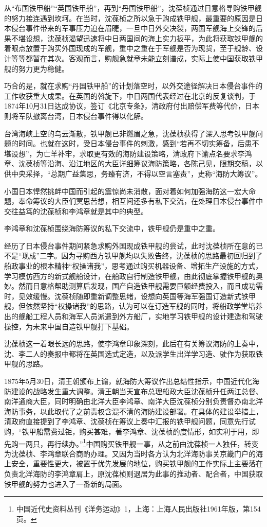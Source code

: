 \documentclass[12pt,UTF8]{ctexbook}
\begin{document}
从“布国铁甲船”“英国铁甲船”，再到“丹国铁甲船”，沈葆桢通过日意格寻购铁甲舰的努力接连遇到坎坷。在当时，沈葆桢之所以急于购成铁甲舰，最重要的原因是日本侵台事件带来的军事压力迫在眉睫，一旦中日外交决裂，两国军舰海上交锋的后果不堪设想，沈葆桢渴望迅速将中日两国间的海上实力扳平，为此将获取铁甲舰的着眼点放置于购买外国现成的军舰，重中之重在于军舰是否为现货，至于舰龄、设计等等都暂在其次。客观而言，购舰急就章未能立刻谱成，实际上使中国获取铁甲舰的努力更为稳健。

巧合的是，就在求购“丹国铁甲船”的计划落空时，以外交途径解决日本侵台事件的工作收获重大成果。在英国的斡旋下，中日两国代表经过在北京的反复谈判，于1874年10月31日达成协议，签订《北京专条》，清政府付出赔偿军费等代价，日本则将军队撤离台湾，日本侵台事件得以化解。

台湾海峡上空的乌云渐散，铁甲舰已非燃眉之急，沈葆桢获得了深入思考铁甲舰问题的时间。也就在这时，受日本侵台事件的刺激，感到“若再不切实筹备，后患不堪设想”，为亡羊补牢，求取更有效的海防建设策略，清政府下谕点名要求李鸿章、沈葆桢等沿海、沿江地区的大臣详细筹议海防策略，各陈己见，限期交稿，以供中央采择，“总期广益集思，务臻有济，不得以空言塞责”，史称“海防大筹议”。

小国日本悍然挑衅中国而引起的震惊尚未消散，面对着如何加强海防这一宏大命题，奉命筹议的大臣们冥思苦想，相互间还多有私下交流，在处理日本侵台事件中交往益笃的沈葆桢和李鸿章就是其中的典型。

李鸿章和沈葆桢围绕海防筹议的私下交流中，铁甲舰仍是重中之重。

经历了日本侵台事件期间紧急求购外国现成铁甲舰的尝试，此时沈葆桢所在意的已不是“现成”二字。因为寻购西方铁甲舰均以失败告终，沈葆桢的思路最初回归到了船政事业的根本精神“权操诸我”，思考通过购买机器设备、增拓生产设施的方式，学习模仿西方的新式舰船设计，在船政自行制造铁甲舰，由此彻底掌握铁甲舰的奥妙。然而日意格帮助测算后发现，国产自造铁甲舰需要巨额经费投入，而且成功需时，见效缓慢。沈葆桢随即重新调整思绪，设想向英国等海军强国订造新式铁甲舰，但依然坚持“权操诸我”的思路，认为可以在订造军舰的同时，将船政学堂培养出的舰船工程人员和海军人员派遣到外方船厂，实地学习铁甲舰的设计建造和驾驶操控，为未来中国自造铁甲舰打下基础。

沈葆桢这一着眼长远的思路，使李鸿章印象深刻，此后在有关筹议海防的上奏中，沈、李二人的奏报中都将在英国选式定造，以及派学生出洋学习造、驶作为获取铁甲舰的思路。

1875年5月30日，清王朝颁布上谕，就海防大筹议作出总结性指示，中国近代化海防建设的战略发生重大调整。清王朝当天宣布总理船政大臣沈葆桢升任两江总督、南洋通商大臣，同时明确由北洋大臣李鸿章、南洋大臣沈葆桢分别负责督办南北洋海防事务，以此取代了之前责权含混不清的海防建设部署。在具体的建设举措上，清政府直接提到了李鸿章、沈葆桢在筹议上奏中汇报的铁甲舰问题，同意先行试购，“铁甲船需费过钜，购买甚难，著李鸿章、沈葆桢酌度情形，如实利于用，即先购一两只，再行续办。”\footnote{中国近代史资料丛刊《洋务运动》1，上海：上海人民出版社1961年版，第154页。}中国购买铁甲舰一事，从之前由沈葆桢一人独任，转变为沈葆桢、李鸿章联合商酌办理。又因为当时各方认为北洋海防事关京畿门户的海上安全，重要性更大，被置于优先发展的地位，购买铁甲舰的工作实际上主要落在负责北洋海防的李鸿章肩上，原沈葆桢则退居为此事的推动者、配合者，中国获取铁甲舰的努力也进入了一番新的局面。
\end{document}
